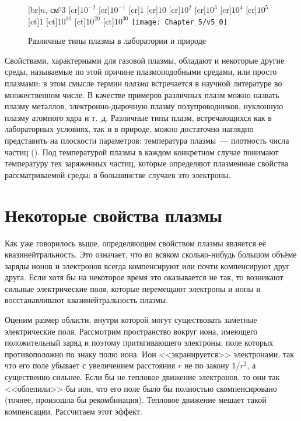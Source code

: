 \begin{figure}
	[br]{\footnotesize $n$, см\^{-3}}
	[cr]{\footnotesize $10^{-2}$}
	[cr]{\footnotesize $10^{-1}$}
	[cr]{\footnotesize $1$}
	[cr]{\footnotesize $10$}
	[cr]{\footnotesize $10^{2}$}
	[cr]{\footnotesize $10^{3}$}
	[cr]{\footnotesize $10^{4}$}
	[cr]{\footnotesize $10^{5}$}
	[ct]{\footnotesize $1$}
	[ct]{\footnotesize $10^{10}$}
	[ct]{\footnotesize $10^{20}$}
	[ct]{\footnotesize $10^{30}$}
	\texttt{[image: Chapter\_5/v5\_0]}
	\caption{Различные типы плазмы в лаборатории и природе}
	\figmark[0]
\end{figure}


Свойствами, характерными для газовой плазмы, обладают и некоторые другие среды, называемые по этой причине
плазмоподобными средами, или просто плазмами: в этом смысле термин {\em плазма} встречается в научной литературе во
множественном числе. В качестве примеров различных плазм можно назвать плазму металлов, электронно-дырочную плазму
полупроводников, нуклонную плазму атомного ядра и т.~д. Различные типы плазм, встречающихся как в лабораторных условиях,
так и в природе, можно достаточно наглядно представить на плоскости параметров: температура плазмы~--- плотность числа
частиц (). Под температурой плазмы в каждом конкретном случае понимают температуру тех заряженных частиц, которые
определяют плазменные свойства рассматриваемой среды: в большинстве случаев это электроны.

\section{Некоторые свойства плазмы}

Как уже говорилось выше, определяющим свойством плазмы является её квазинейтральность. Это означает, что во всяком
сколько-нибудь большом объёме заряды ионов и электронов всегда компенсируют или почти компенсируют друг друга. Если хотя
бы на некоторое время это оказывается не так, то возникают сильные электрические поля, которые перемещают электроны и
ионы и восстанавливают квазинейтральность плазмы.

Оценим размер области, внутри которой могут существовать заметные электрические поля. Рассмотрим пространство вокруг
иона, имеющего положительный заряд и поэтому притягивающего электроны, поле которых противоположно по знаку полю иона.
Ион <<экранируется>> электронами, так что его поле убывает с увеличением расстояния $r$ не по закону $1/r^2$, а
существенно сильнее. Если бы не тепловое движение электронов, то они так <<облепили>> бы ион, что его поле было бы
полностью скомпенсировано (точнее, произошла бы рекомбинация). Тепловое движение мешает такой компенсации. Рассчитаем
этот эффект.

